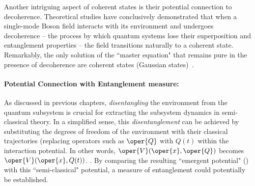 Another intriguing aspect of coherent states is their potential connection to decoherence. Theoretical studies have conclusively demonstrated that when a single-mode Boson field interacts with its environment and undergoes decoherence – the process by which quantum systems lose their superposition and entanglement properties – the field transitions naturally to a coherent state. Remarkably, the only solution of the ``master equation" that remains pure in the presence of decoherence are coherent states (Gaussian states)~\cite{dutra1998decoherence, zuerk_coherent_state_1993}. 

\paragraph{Potential Connection with Entanglement measure: } As discussed in previous chapters, \textit{disentangling} the environment from the quantum subsystem is crucial for extracting the subsystem dynamics in semi-classical theory.  In a simplified sense, this \textit{disentanglement} can be achieved by substituting the degrees of freedom of the environment with their classical trajectories (replacing operators such as $\oper{Q}$ with $Q (t)$ within the interaction potential. In other words, $\oper{V}(\oper{x}, \oper{Q})$ becomes $\oper{V}(\oper{x}, Q(t))$. . By comparing the resulting ``emergent potential" () with this ``semi-classical" potential, a measure of entanglement could potentially be established.



